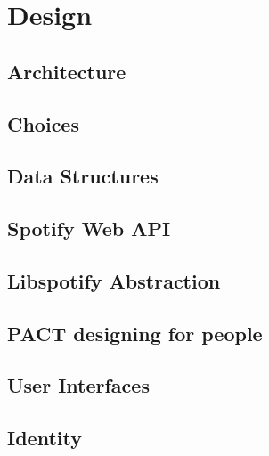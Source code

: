 \chapter{Design}


\section{Architecture}


\section{Choices}




\section{Data Structures}




\section{Spotify Web API}


\section{Libspotify Abstraction}


\section{PACT designing for people}


\section{User Interfaces}


\section{Identity}

